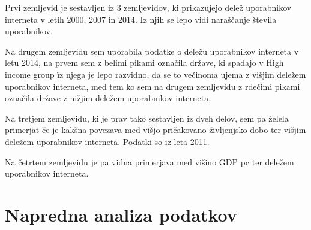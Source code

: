 \documentclass[11pt,a4paper]{article}
\begin{document}
Prvi zemljevid je sestavljen iz 3 zemljevidov, ki prikazujejo delež uporabnikov interneta v letih 2000, 2007 in 2014. Iz njih se lepo vidi naraščanje števila uporabnikov.
\\
\newpage
\begin{figure}
 
\end{figure}

\newpage

Na drugem zemljevidu sem uporabila podatke o deležu uporabnikov interneta v letu 2014, na prvem sem z belimi pikami označila države, ki spadajo v \"High income group \" iz njega je lepo razvidno, da se to večinoma ujema z višjim deležem uporabnikov interneta, med tem ko sem na drugem zemljevidu z rdečimi pikami označila države z nižjim deležem uporabnikov interneta.
\begin{figure}
  
\end{figure}

\newpage
Na tretjem zemljevidu, ki je prav tako sestavljen iz dveh delov, sem pa želela primerjat če je kakšna povezava med višjo pričakovano življenjsko dobo ter višjim deležem uporabnikov interneta. Podatki so iz leta 2011.

\begin{figure}
  
\end{figure}

\newpage
Na četrtem zemljevidu je pa vidna primerjava med višino GDP pc ter deležem uporabnikov interneta.

\begin{figure}
  
\end{figure}

\newpage
\section{Napredna analiza podatkov}
\end{document}
